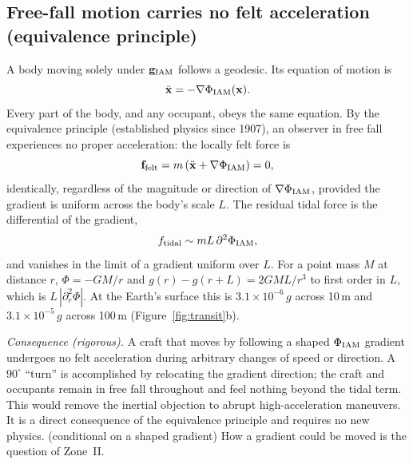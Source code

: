 \subsection{Free-fall motion carries no felt acceleration (equivalence principle)}\label{sec:ge_freefall}
A body moving solely under $\mathbf g_{\rm IAM}$ follows a geodesic. Its equation of motion is
\begin{equation}
\ddot{\mathbf x}=-\nabla\Phi_{\rm IAM}(\mathbf x).
\label{eq:ge_eom}
\end{equation}
Every part of the body, and any occupant, obeys the same equation. By the equivalence principle (established physics since 1907), an observer in free
fall experiences no proper acceleration: the locally felt force is
\begin{equation}
\mathbf f_{\rm felt}=m\left(\ddot{\mathbf x}+\nabla\Phi_{\rm IAM}\right)=0,
\label{eq:ge_felt}
\end{equation}
identically, regardless of the magnitude or direction of $\nabla\Phi_{\rm IAM}$, provided the gradient is uniform across the body's scale $L$.
\derived{} The residual tidal force is the differential of the gradient,
\begin{equation}
f_{\rm tidal}\sim mL\,\partial^2\Phi_{\rm IAM},
\label{eq:ge_tidal}
\end{equation}
and vanishes in the limit of a gradient uniform over $L$. For a point mass $M$ at distance $r$, $\Phi=-GM/r$ and $g(r)-g(r+L)=2GML/r^3$ to first
order in $L$, which is $L\,|\partial_r^2\Phi|$. \derived{} At the Earth's surface this is $3.1\times10^{-6}\,g$ across 10\,m and
$3.1\times10^{-5}\,g$ across 100\,m (Figure~\ref{fig:transit}b). \calc

\emph{Consequence (rigorous).} A craft that moves by following a shaped $\Phi_{\rm IAM}$ gradient undergoes no felt acceleration during arbitrary
changes of speed or direction. A $90^\circ$ ``turn'' is accomplished by relocating the gradient direction; the craft and occupants remain in free fall
throughout and feel nothing beyond the tidal term. This would remove the inertial objection to abrupt high-acceleration maneuvers. It is a direct
consequence of the equivalence principle and requires no new physics. \derived{} (conditional on a shaped gradient) How a gradient could be moved is the question of Zone~II.

